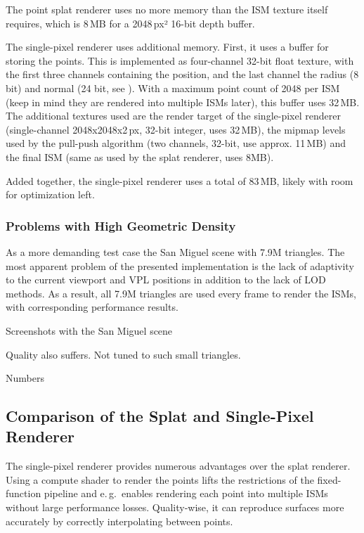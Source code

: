 The point splat renderer uses no more memory than the ISM texture itself requires, which is 8\,MB for a 2048\,px² 16-bit depth buffer.

The single-pixel renderer uses additional memory. First, it uses a buffer for storing the points. This is implemented as four-channel 32-bit float texture, with the first three channels containing the position, and the last channel the radius (8 bit) and normal (24 bit, see \cite{Cigolle:2014:NormalPacking}). With a maximum point count of 2048 per ISM (keep in mind they are rendered into multiple ISMs later), this buffer uses 32\,MB.
The additional textures used are the render target of the single-pixel renderer (single-channel 2048x2048x2\,px, 32-bit integer, uses 32\,MB), the mipmap levels used by the pull-push algorithm (two channels, 32-bit, use approx. 11\,MB) and the final ISM (same as used by the splat renderer, uses 8MB).

Added together, the single-pixel renderer uses a total of 83\,MB, likely with room for optimization left.


\subsubsection{Problems with High Geometric Density}
\label{sec:results:ism:densityProblems}

As a more demanding test case the San Miguel scene with 7.9M triangles. The most apparent problem of the presented implementation is the lack of adaptivity to the current viewport and VPL positions in addition to the lack of LOD methods. As a result, all 7.9M triangles are used every frame to render the ISMs, with corresponding performance results.

Screenshots with the San Miguel scene

Quality also suffers. Not tuned to such small triangles.

Numbers


\subsection{Comparison of the Splat and Single-Pixel Renderer}
\label{sec:results:ism:comparison}


The single-pixel renderer provides numerous advantages over the splat renderer. Using a compute shader to render the points lifts the restrictions of the fixed-function pipeline and e.\,g.\ enables rendering each point into multiple ISMs without large performance losses. Quality-wise, it can reproduce surfaces more accurately by correctly interpolating between points.

